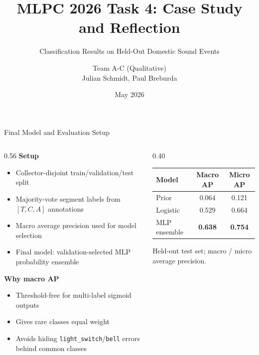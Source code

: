 \documentclass[aspectratio=169,english]{beamer}
\title{MLPC 2026 Task 4: Case Study and Reflection}
\subtitle{Classification Results on Held-Out Domestic Sound Events}
\author{Team A-C (Qualitative) \\ Julian Schmidt, Paul Breburda}
\date{May 2026}
\begin{document}
\begin{frame}{Final Model and Evaluation Setup}
  \begin{columns}[c]
    \begin{column}{0.56\textwidth}
      \textbf{Setup}
      \begin{itemize}
        \item Collector-disjoint train/validation/test split
        \item Majority-vote segment labels from $[T,C,A]$ annotations
        \item Macro average precision used for model selection
        \item Final model: validation-selected MLP probability ensemble
      \end{itemize}
      \vspace{0.6em}
      \textbf{Why macro AP}
      \begin{itemize}
        \item Threshold-free for multi-label sigmoid outputs
        \item Gives rare classes equal weight
        \item Avoids hiding \texttt{light\_switch}/\texttt{bell} errors behind common classes
      \end{itemize}
    \end{column}
    \begin{column}{0.40\textwidth}
      \centering
      \begin{tabular}{lcc}
        \toprule
        Model & Macro AP & Micro AP \\
        \midrule
        Prior & 0.064 & 0.121 \\
        Logistic & 0.529 & 0.664 \\
        MLP ensemble & \textbf{0.638} & \textbf{0.754} \\
        \bottomrule
      \end{tabular}
      \vspace{0.6em}

      {\footnotesize Held-out test set; macro / micro average precision.}
    \end{column}
  \end{columns}
\end{frame}
\end{document}
